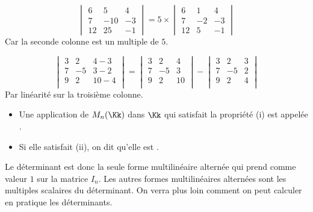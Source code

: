 \documentclass[class=report,crop=false]{standalone}
\begin{document}
\begin{exemple}
$$\begin{vmatrix}
6&5&4\\7&-10&-3\\12&25&-1
  \end{vmatrix}
=
5\times\begin{vmatrix}
6&1&4\\7&-2&-3\\12&5&-1
  \end{vmatrix} $$
Car la seconde colonne est un multiple de $5$.

\bigskip

$$\begin{vmatrix}
3&2&4-3\\7&-5&3-2\\9&2&10-4\\
  \end{vmatrix}
=
\begin{vmatrix}
3&2&4\\7&-5&3\\9&2&10\\
  \end{vmatrix}
  - \begin{vmatrix}
3&2&3\\7&-5&2\\9&2&4\\
  \end{vmatrix}
$$
Par linéarité sur la troisième colonne.

\end{exemple}


\begin{remarque*}
\sauteligne
\begin{itemize}
  \item Une application de $M_n(\Kk)$ dans $\Kk$ qui satisfait la propriété
(i) est appelée .

  \item Si elle satisfait (ii), on dit qu'elle est .
\end{itemize}

Le déterminant est donc la seule forme multilinéaire alternée qui prend comme valeur $1$ sur la matrice
$I_n$. Les autres formes multilinéaires alternées sont les
multiples scalaires du déterminant. On verra plus loin comment on
peut calculer en pratique les déterminants.
\end{remarque*}



\end{document}
